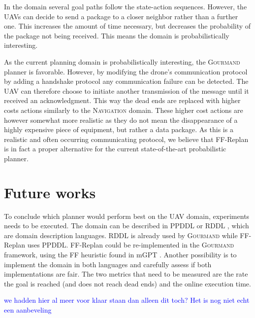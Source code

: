 \documentclass[runningheads,a4paper]{llncs}
\newcommand\todo[1]{\textcolor{blue}{#1}}
\begin{document}
In the domain several goal paths follow the state-action sequences. However,
the UAVs can decide to send a package to a closer neighbor rather than a
further one. This increases the amount of time necessary, but decreases the
probability of the package not being received. This means the domain is
probabilistically interesting.

As the current planning domain is probabilistically interesting, the
\textsc{Gourmand} planner is favorable. However, by modifying the drone's
communication protocol by adding a handshake protocol any communication failure
can be detected. The UAV can therefore choose to initiate another transmission
of the message until it received an acknowledgment. This way the dead ends are
replaced with higher costs actions similarly to the \textsc{Navigation} domain.
These higher cost actions are however somewhat more realistic as they do not
mean the disappearance of a highly expensive piece of equipment, but rather a
data package. As this is a realistic and often occurring communicating
protocol, we believe that FF-Replan is in fact a proper alternative for the
current state-of-the-art probabilistic planner.


\section{Future works}

To conclude which planner would perform best on the UAV domain, experiments
needs to be executed. The domain can be described in PPDDL
\cite{younes2004ppddl1} or RDDL \cite{Sanner:RDDL}, which are domain
description languages. RDDL is already used by \textsc{Gourmand} while
FF-Replan uses PPDDL\@. FF-Replan could be re-implemented in the
\textsc{Gourmand} framework, using the FF heuristic found in mGPT
\cite{bonet2011planning}. Another possibility is to implement the domain in
both languages and carefully assess if both implementations are fair.  The two
metrics that need to be measured are the rate the goal is reached (and does not
reach dead ends) and the online execution time.

\todo{we hadden hier al meer voor klaar staan dan alleen dit toch? Het is nog niet echt een aanbeveling}



\end{document}
